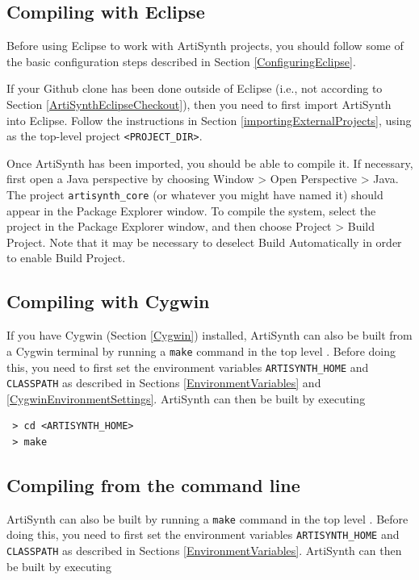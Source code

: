 \subsection{Compiling with Eclipse}
\label{CompilingWithEclipse}

Before using Eclipse to work with ArtiSynth projects, you should
follow some of the basic configuration steps described in
Section \ref{ConfiguringEclipse}.

If your Github clone has been done outside of Eclipse (i.e.,
not according to Section \ref{ArtiSynthEclipseCheckout}), then you
need to first import ArtiSynth into Eclipse. Follow the instructions
in Section \ref{importingExternalProjects}, using 
\ArtHome[] as the top-level project \directory{}
{\tt <PROJECT\_DIR>}.

Once ArtiSynth has been imported, you should be able to compile it.  If
necessary, first open a Java perspective by choosing {\sf Window >
Open Perspective > Java}. The project {\tt artisynth\_core} (or
whatever you might have named it) should appear in the {\sf Package
Explorer} window. To compile the system, select the project in the {\sf
Package Explorer} window, and then choose {\sf Project > Build
Project}. Note that it may be necessary to deselect {\sf Build
Automatically} in order to enable {\sf Build Project}.

\ifWindows
\subsection{Compiling with Cygwin}
\label{CompilingWithCygwin}

If you have Cygwin (Section \ref{Cygwin}) installed, 
ArtiSynth can also be built from a Cygwin terminal by running
a {\tt make} command in the top level \directory{}. Before doing this,
you need to first set the environment variables {\tt ARTISYNTH\_HOME}
and {\tt CLASSPATH} as described in Sections
\ref{EnvironmentVariables} and \ref{CygwinEnvironmentSettings}.
ArtiSynth can then be built by executing

\begin{verbatim}
 > cd <ARTISYNTH_HOME>
 > make
\end{verbatim}
\else %
\subsection{Compiling from the command line}
\label{CompilingWithCygwin}

ArtiSynth can also be built by running a {\tt make} command in the top
level \directory{}. Before doing this, you need to first set the environment
variables {\tt ARTISYNTH\_HOME} and {\tt CLASSPATH} as described in
Sections \ref{EnvironmentVariables}. ArtiSynth can then be built by
executing


